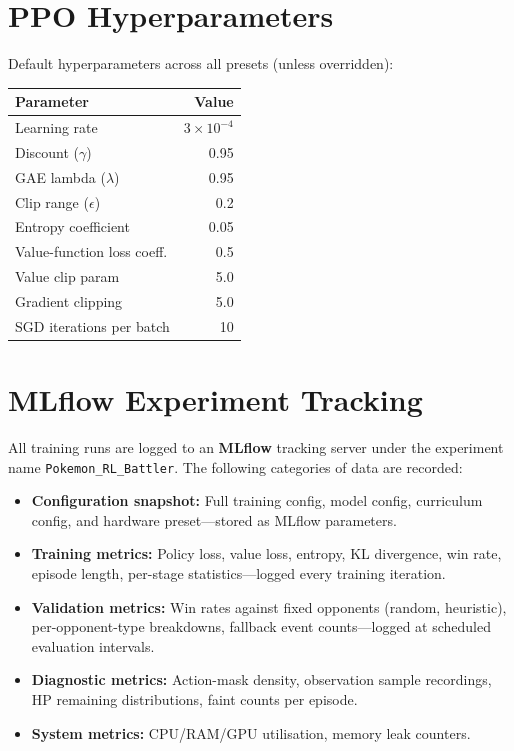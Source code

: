 \section{PPO Hyperparameters}

Default hyperparameters across all presets (unless overridden):

\begin{center}
\small
\begin{tabularx}{0.7\textwidth}{l r}
  \toprule
  \textbf{Parameter} & \textbf{Value} \\
  \midrule
  Learning rate              & $3 \times 10^{-4}$ \\
  Discount ($\gamma$)        & 0.95 \\
  GAE lambda ($\lambda$)     & 0.95 \\
  Clip range ($\epsilon$)    & 0.2 \\
  Entropy coefficient        & 0.05 \\
  Value-function loss coeff. & 0.5 \\
  Value clip param           & 5.0 \\
  Gradient clipping          & 5.0 \\
  SGD iterations per batch   & 10 \\
  \bottomrule
\end{tabularx}
\end{center}

\section{MLflow Experiment Tracking}

All training runs are logged to an \textbf{MLflow} tracking server under the
experiment name \texttt{Pokemon\_RL\_Battler}.  The following categories of
data are recorded:

\begin{itemize}
  \item \textbf{Configuration snapshot:} Full training config, model config,
        curriculum config, and hardware preset---stored as MLflow parameters.
  \item \textbf{Training metrics:} Policy loss, value loss, entropy,
        KL divergence, win rate, episode length, per-stage statistics---logged
        every training iteration.
  \item \textbf{Validation metrics:} Win rates against fixed opponents
        (random, heuristic), per-opponent-type breakdowns, fallback event
        counts---logged at scheduled evaluation intervals.
  \item \textbf{Diagnostic metrics:} Action-mask density, observation sample
        recordings, HP remaining distributions, faint counts per episode.
  \item \textbf{System metrics:} CPU/RAM/GPU utilisation, memory leak counters.
\end{itemize}

